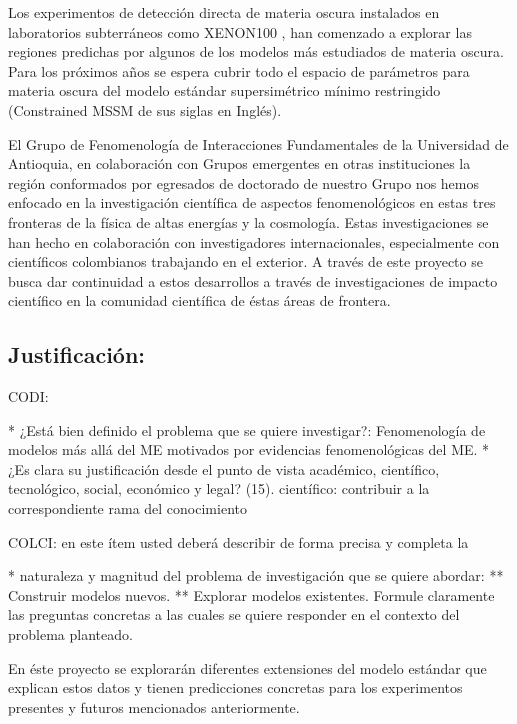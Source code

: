 Los experimentos de detección directa de materia oscura instalados en
laboratorios subterráneos como XENON100 \cite{Aprile:2011ts}, han
comenzado a explorar las regiones predichas por algunos de los modelos
más estudiados de materia oscura. Para los próximos años se espera
cubrir todo el espacio de parámetros para materia oscura del modelo
estándar supersimétrico mínimo restringido (Constrained MSSM de sus
siglas en Inglés).  

El Grupo de Fenomenología de Interacciones Fundamentales de la
Universidad de Antioquia, en colaboración con Grupos emergentes en
otras instituciones la región conformados por egresados de doctorado
de nuestro Grupo nos hemos enfocado en la investigación científica de
aspectos fenomenológicos en estas tres fronteras de la física de altas
energías y la cosmología. Estas investigaciones se han hecho en
colaboración con investigadores internacionales, especialmente con
científicos colombianos trabajando en el exterior. A través de este
proyecto se busca dar continuidad a estos desarrollos a través de
investigaciones de impacto científico en la comunidad científica de
éstas áreas de frontera.

\subsection{Justificación:                                 }
\begin{instrucciones}
  CODI: 

  * ¿Está bien definido el problema que se quiere investigar?:
  Fenomenología de modelos más allá del ME motivados por evidencias
  fenomenológicas del ME.  
  * ¿Es clara su justificación desde el punto de vista académico,
  científico, tecnológico, social, económico y legal? (15).
  científico: contribuir a la correspondiente rama del conocimiento

  COLCI: en este ítem usted deberá describir de forma precisa y completa la
  
  * naturaleza y magnitud del problema de investigación que se quiere
  abordar:
  ** Construir modelos nuevos.
  ** Explorar modelos existentes.
  Formule claramente las preguntas concretas a las cuales se
  quiere responder en el contexto del problema planteado.
\end{instrucciones}




En éste proyecto se explorarán diferentes extensiones del modelo
estándar que explican estos datos y tienen predicciones
concretas para los experimentos presentes y futuros mencionados
anteriormente.

